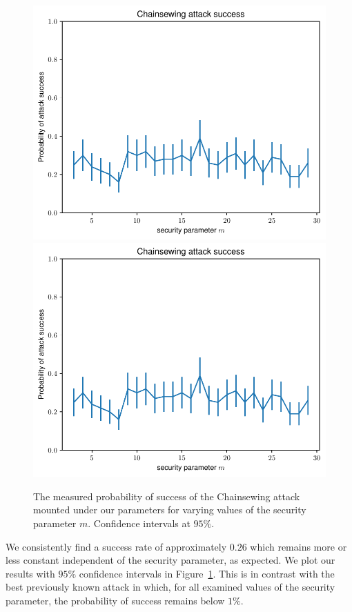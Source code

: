 \begin{figure}[h!]
	\begin{center}
		\iftwocolumn
			\includegraphics[width=\columnwidth]{figures/attack-confidence.pdf}
		\else
			\includegraphics[width=0.7 \columnwidth]{figures/attack-confidence.pdf}
		\fi
	\end{center}
	\caption{The measured probability of success of the Chainsewing attack mounted under our parameters for varying values of the security parameter $m$. Confidence intervals at $95\%$.}
	\label{fig:confidence}
\end{figure}

We consistently find a success rate of approximately $0.26$ which remains more or less constant independent of the security parameter, as expected. We plot our results with $95\%$ confidence intervals in Figure~\ref{fig:confidence}. This is in contrast with the best previously known attack in which, for all examined values of the security parameter, the probability of success remains below $1\%$.
